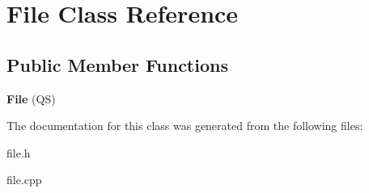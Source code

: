 \hypertarget{classFile}{\section{File Class Reference}
\label{classFile}
}
\subsection*{Public Member Functions}
\begin{DoxyCompactItemize}
\item 
\hypertarget{classFile_ad6189c0470b40e93492c27b51cce55c7}{{\bfseries File} (Q\-S)}\label{classFile_ad6189c0470b40e93492c27b51cce55c7}

\end{DoxyCompactItemize}


The documentation for this class was generated from the following files\-:\begin{DoxyCompactItemize}
\item 
file.\-h\item 
file.\-cpp\end{DoxyCompactItemize}
